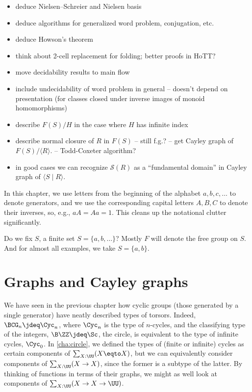 \begin{itemize}
\item deduce Nielsen--Schreier and Nielsen basis
\item deduce algorithms for generalized word problem, conjugation, etc.
\item deduce Howson's theorem
\item think about 2-cell replacement for folding; better proofs in HoTT?
\item move decidability results to main flow
\item include undecidability of word problem in general
  -- doesn't depend on presentation (for classes closed under inverse images of monoid homomorphisms)
\item describe $F(S)/H$ in the case where $H$ has infinite index
\item describe normal closure of $R$ in $F(S)$ -- still f.g.? -- get Cayley graph of $F(S)/\langle R\rangle$. -- Todd-Coxeter algorithm?
\item in good cases we can recognize $\mathcal{S}(R)$ as a ``fundamental domain'' in Cayley graph of $\langle S\mid R\rangle$.
\end{itemize}

\begin{remark}
  In this chapter, we use letters from the
  beginning of the alphabet $a,b,c,\dots$
  to denote generators,
  and we use the corresponding capital letters
  $A,B,C$ to denote their inverses,
  so, e.g., $aA=Aa=1$.
  This cleans up the notational clutter significantly.
\end{remark}

Do we fix $S$, a finite set $S=\{a,b,\ldots\}$?
Mostly $F$ will denote the free group on $S$.
And for almost all examples, we take $S = \{a,b\}$.

\section{Graphs and Cayley graphs}
\label{sec:cayley-graphs}

We have seen in the previous chapter how cyclic groups
(those generated by a single generator)
have neatly described types of torsors.
Indeed, $\BCG_n \jdeq \Cyc_n$, where $\Cyc_n$ is the type of $n$-cycles,
and the classifying type of the integers, $\B\ZZ\jdeq\Sc$, \ie the circle,
is equivalent to the type of infinite cycles, $\Cyc_0$.
In \cref{cha:circle}, we defined the types of (finite or infinite)
cycles as certain components of $\sum_{X:\UU}(X\eqto X)$,
but we can equivalently consider components of $\sum_{X:\UU}(X\to X)$,
since the former is a subtype of the latter.
By thinking of functions in terms of their graphs,
we might as well look at components of $\sum_{X:\UU}(X \to X \to \UU)$.

